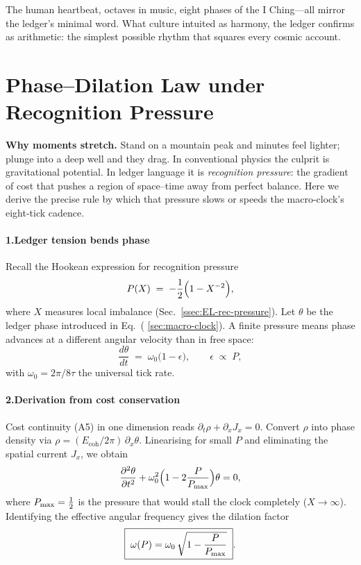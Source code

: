 \documentclass[11pt,oneside]{book}
\newcommand{\Eoh}{\ensuremath{E_{\text{coh}}}}       %
\begin{document}
The human heartbeat, octaves in music, eight phases of the I Ching—all
mirror the ledger’s minimal word.  
What culture intuited as harmony, the ledger confirms as arithmetic: the
simplest possible rhythm that squares every cosmic account.

\section{Phase–Dilation Law under Recognition Pressure}
\label{sec:phase-dilation}

\noindent
\textbf{Why moments stretch.}  
Stand on a mountain peak and minutes feel lighter; plunge into a deep well and they drag.  
In conventional physics the culprit is gravitational potential.  
In ledger language it is \emph{recognition pressure}: the gradient of cost that pushes a region of space–time away from perfect balance.  
Here we derive the precise rule by which that pressure slows or speeds the macro-clock’s eight-tick cadence.

\paragraph*{1.\;Ledger tension bends phase}

Recall the Hookean expression for recognition pressure
\[
  P(X) \;=\; -\frac12\Bigl(1 - X^{-2}\Bigr),
\]
where $X$ measures local imbalance (Sec.~\ref{ssec:EL-rec-pressure}).  
Let $\theta$ be the ledger phase introduced in Eq.~(%
\ref{sec:macro-clock}).  
A finite pressure means phase advances at a different angular velocity
than in free space:
\[
  \frac{d\theta}{dt}
  \;=\;
  \omega_{0}\bigl(1 - \epsilon\bigr),
  \qquad
  \epsilon \;\propto\; P,
\]
with $\omega_{0}=2\pi/8\tau$ the universal tick rate.

\paragraph*{2.\;Derivation from cost conservation}

Cost continuity (A5) in one dimension reads
\(\partial_t\rho + \partial_x J_x = 0\).  
Convert $\rho$ into phase density via
$\rho = (\Eoh/2\pi)\,\partial_x\theta$.  
Linearising for small $P$ and eliminating the spatial current
$J_x$, we obtain
\[
  \frac{\partial^2\theta}{\partial t^2}
  + \omega_{0}^{2}\Bigl(1 - 2\frac{P}{P_{\rm max}}\Bigr)\theta
  = 0,
\]
where \(P_{\rm max}=\tfrac12\) is the pressure that would stall the
clock completely ($X\!\to\!\infty$).  
Identifying the effective angular frequency gives the dilation factor
\[
  \boxed{\;
  \omega(P)
  = \omega_{0}\,\sqrt{1 - \frac{P}{P_{\rm max}}}\;}.
\]
\end{document}
